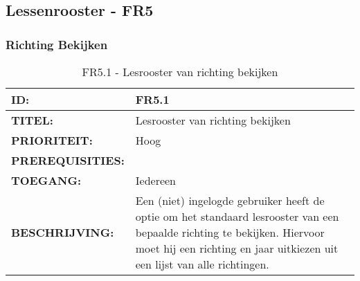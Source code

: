 \subsection{Lessenrooster - FR5}

\subsubsection{Richting Bekijken}   
\noindent\begin{table}[H]
            \begin{tabular}{l | p{10cm}}
                \textbf{ID:} & FR5.1 \\ \hline
                \textbf{TITEL:} & Lesrooster van richting bekijken \\ \hline
                \textbf{PRIORITEIT:} &  Hoog \\ \hline
                \textbf{PREREQUISITIES:} & \\ \hline
                \textbf{TOEGANG:} &  Iedereen \\ \hline
                \textbf{BESCHRIJVING:} & Een (niet) ingelogde gebruiker heeft de optie om het standaard lesrooster van een bepaalde richting te bekijken. Hiervoor moet hij een richting en jaar uitkiezen uit een lijst van alle richtingen.\\
            \end{tabular}\\
            \caption{FR5.1 - Lesrooster van richting bekijken}
            \label{tab:FR5.1 - Lesrooster van richting bekijken}
        \end{table}

